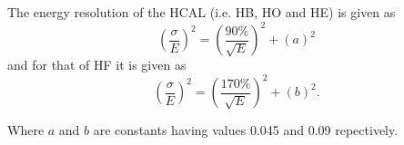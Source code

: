 \par The energy resolution of the HCAL (i.e. HB, HO and HE) is given as
\begin{equation}
 \left(\frac{\sigma}{E}\right)^{2}= \left(\frac{90\%}{\sqrt{E}}\right)^{2}+(a)^2        
\end{equation}
and for that of HF it is given as
\begin{equation}
 \left(\frac{\sigma}{E}\right)^{2}= \left(\frac{170\%}{\sqrt{E}}\right)^{2}+(b)^2.        
\end{equation}

Where $a$ and $b$ are constants having values 0.045 and 0.09 repectively.


